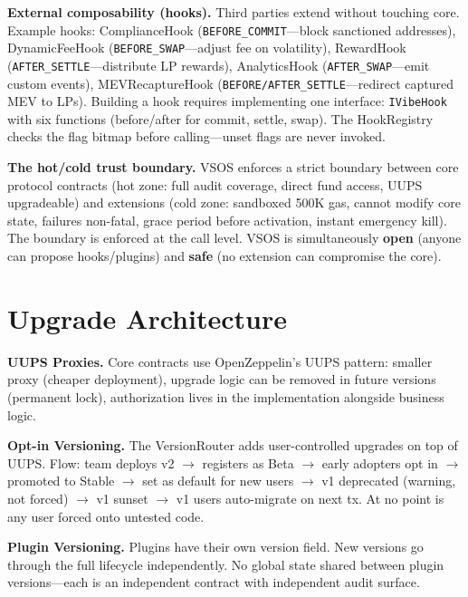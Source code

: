 \documentclass[9pt, letterpaper]{article}
\begin{document}
\textbf{External composability (hooks).} Third parties extend without touching core. Example hooks: ComplianceHook (\texttt{BEFORE\_COMMIT}---block sanctioned addresses), DynamicFeeHook (\texttt{BEFORE\_SWAP}---adjust fee on volatility), RewardHook (\texttt{AFTER\_SETTLE}---distribute LP rewards), AnalyticsHook (\texttt{AFTER\_SWAP}---emit custom events), MEVRecaptureHook (\texttt{BEFORE/AFTER\_SETTLE}---redirect captured MEV to LPs). Building a hook requires implementing one interface: \texttt{IVibeHook} with six functions (before/after for commit, settle, swap). The HookRegistry checks the flag bitmap before calling---unset flags are never invoked.

\textbf{The hot/cold trust boundary.} VSOS enforces a strict boundary between core protocol contracts (hot zone: full audit coverage, direct fund access, UUPS upgradeable) and extensions (cold zone: sandboxed 500K gas, cannot modify core state, failures non-fatal, grace period before activation, instant emergency kill). The boundary is enforced at the call level. VSOS is simultaneously \textbf{open} (anyone can propose hooks/plugins) and \textbf{safe} (no extension can compromise the core).


\section{Upgrade Architecture}

\textbf{UUPS Proxies.} Core contracts use OpenZeppelin's UUPS pattern: smaller proxy (cheaper deployment), upgrade logic can be removed in future versions (permanent lock), authorization lives in the implementation alongside business logic.

\textbf{Opt-in Versioning.} The VersionRouter adds user-controlled upgrades on top of UUPS. Flow: team deploys v2 $\to$ registers as Beta $\to$ early adopters opt in $\to$ promoted to Stable $\to$ set as default for new users $\to$ v1 deprecated (warning, not forced) $\to$ v1 sunset $\to$ v1 users auto-migrate on next tx. At no point is any user forced onto untested code.

\textbf{Plugin Versioning.} Plugins have their own version field. New versions go through the full lifecycle independently. No global state shared between plugin versions---each is an independent contract with independent audit surface.
\end{document}
